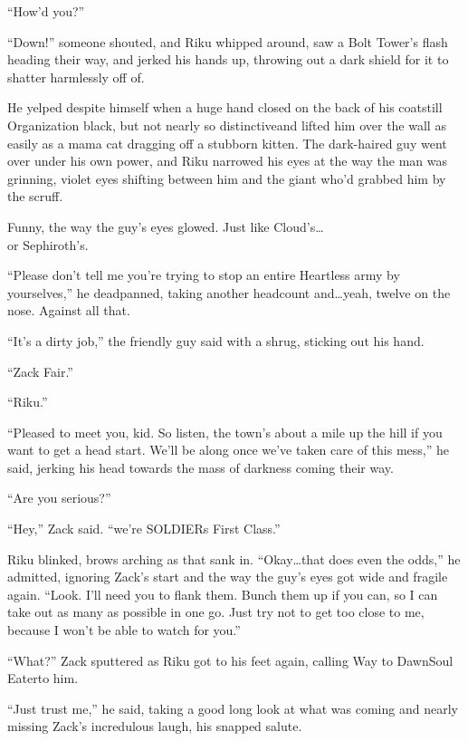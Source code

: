 ``How'd you\textemdash ?''
\begin{sloppypar}
``Down!'' someone shouted, and Riku whipped around, saw a Bolt Tower's flash heading their way, and jerked his hands up, throwing out a dark shield for it to shatter harmlessly off of.
\end{sloppypar}
He yelped despite himself when a huge hand closed on the back of his coat\textemdash still Organization black, but not nearly so distinctive\textemdash and lifted him over the wall as easily as a mama cat dragging off a stubborn kitten. The dark-haired guy went over under his own power, and Riku narrowed his eyes at the way the man was grinning, violet eyes shifting between him and the giant who'd grabbed him by the scruff.
\begin{sloppypar}
Funny, the way the guy's eyes glowed. Just like Cloud's\ldots\\ or Sephiroth's.
\end{sloppypar}
``Please don't tell me you're trying to stop an entire Heartless army by yourselves,'' he deadpanned, taking another headcount and\ldots yeah, twelve on the nose. Against all that.

``It's a dirty job,'' the friendly guy said with a shrug, sticking out his hand. 

``Zack Fair.''

``Riku.''

``Pleased to meet you, kid. So listen, the town's about a mile up the hill if you want to get a head start. We'll be along once we've taken care of this mess,'' he said, jerking his head towards the mass of darkness coming their way.

``Are you serious?''

``Hey,'' Zack said. ``we're SOLDIERs First Class.''
\begin{sloppypar}
Riku blinked, brows arching as that sank in. ``Okay\ldots that does even the odds,'' he admitted, ignoring Zack's start and the way the guy's eyes got wide and fragile again. ``Look. I'll need you to flank them. Bunch them up if you can, so I can take out as many as possible in one go. Just try not to get too close to me, because I won't be able to watch for you.''
\end{sloppypar}
``What?'' Zack sputtered as Riku got to his feet again, calling Way to Dawn\textemdash Soul Eater\textemdash to him.

``Just trust me,'' he said, taking a good long look at what was coming and nearly missing Zack's incredulous laugh, his snapped salute.


